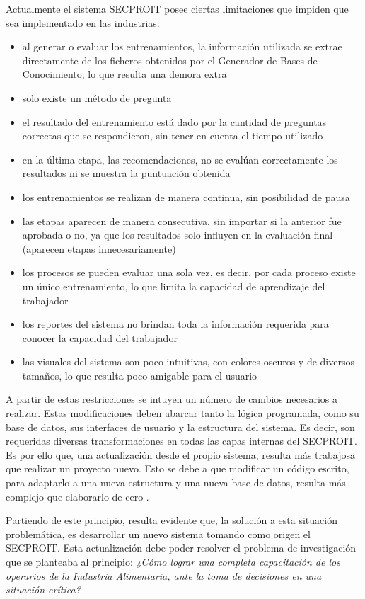Actualmente el sistema SECPROIT posee ciertas limitaciones que impiden que sea implementado en las industrias:
\begin{itemize}
\item al generar o evaluar los entrenamientos, la información utilizada se extrae directamente de los ficheros obtenidos por el Generador de Bases de Conocimiento, lo que resulta una demora extra
\item solo existe un método de pregunta
\item el resultado del entrenamiento está dado por la cantidad de preguntas correctas que se respondieron, sin tener en cuenta el tiempo utilizado
\item en la última etapa, las recomendaciones, no se evalúan correctamente los resultados ni se muestra la puntuación obtenida
\item los entrenamientos se realizan de manera continua, sin posibilidad de pausa
\item las etapas aparecen de manera consecutiva, sin importar si la anterior fue aprobada o no, ya que los resultados solo influyen en la evaluación final (aparecen etapas innecesariamente)
\item los procesos se pueden evaluar una sola vez, es decir, por cada proceso existe un único entrenamiento, lo que limita la capacidad de aprendizaje del trabajador
\item los reportes del sistema no brindan toda la información requerida para conocer la capacidad del trabajador
\item las visuales del sistema son poco intuitivas, con colores oscuros y de diversos tamaños, lo que resulta poco amigable para el usuario
\end{itemize}

A partir de estas restricciones se intuyen un número de cambios necesarios a realizar. Estas modificaciones deben abarcar tanto la lógica programada, como su base de datos, sus interfaces de usuario y la estructura del sistema. Es decir, son requeridas diversas transformaciones en todas las capas internas del SECPROIT.
Es por ello que, una actualización desde el propio sistema, resulta más trabajosa que realizar un proyecto nuevo. Esto se debe a que modificar un código escrito, para adaptarlo a una nueva estructura y una nueva base de datos, resulta más complejo que elaborarlo de cero \cite{Plecka2013}.

Partiendo de este principio, resulta evidente que, la solución a esta situación problemática, es desarrollar un nuevo sistema tomando como origen el SECPROIT.
Esta actualización debe poder resolver el problema de investigación que se planteaba al principio: 
\textsl{¿Cómo lograr una completa capacitación de los operarios de la Industria Alimentaria, ante la toma de decisiones en una situación crítica?}

